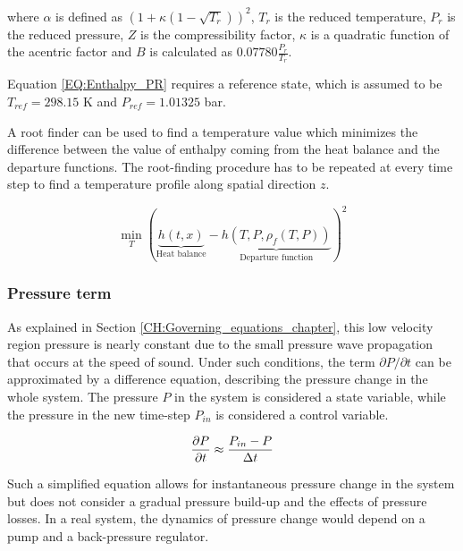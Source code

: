 \documentclass[a4paper,fleqn]{cas-dc}
\begin{document}
	where $\alpha$ is defined as $\left( 1+\kappa \left( 1 - \sqrt{T_r} \right) \right)^2$, $T_r$ is the reduced temperature, $P_r$ is the reduced pressure, $Z$ is the compressibility factor, $\kappa$ is a quadratic function of the acentric factor and $B$ is calculated as $0.07780\frac{P_r}{T_r}$.
	
	Equation \ref{EQ:Enthalpy_PR} requires a reference state, which is assumed to be $T_{ref}=298.15$ K and $P_{ref}=1.01325$ bar.
	
	A root finder can be used to find a temperature value which minimizes the difference between the value of enthalpy coming from the heat balance and the departure functions. The root-finding procedure has to be repeated at every time step to find a temperature profile along spatial direction $z$.
	
	{\footnotesize
		\begin{equation}
			\min_T \left( \underbrace{h\left(t,x\right)}_{\text{Heat balance}} - \underbrace{h\left(T,P,\rho_f\left(T,P\right)\right)}_{\text{Departure function}} \right)^2
			\label{EQ:Enthalpy_root}
		\end{equation}
	}
	
	\subsubsection{Pressure term} \label{CH: Pressure}
	
	As explained in Section \ref{CH:Governing_equations_chapter}, this low velocity region pressure is nearly constant due to the small pressure wave propagation that occurs at the speed of sound. Under such conditions, the term $\partial P/\partial t$ can be approximated by a difference equation, describing the pressure change in the whole system. The pressure $P$ in the system is considered a state variable, while the pressure in the new time-step $P_{in}$ is considered a control variable.
	
	{\footnotesize
		\begin{equation}
			\frac{\partial {\color{black}P}}{\partial t} \approx \frac{{\color{black}P_{in}} - {\color{black}P} }{\Delta t}
	\end{equation}}
	
	Such a simplified equation allows for instantaneous pressure change in the system but does not consider a gradual pressure build-up and the effects of pressure losses. In a real system, the dynamics of pressure change would depend on a pump and a back-pressure regulator.
	
\end{document}
